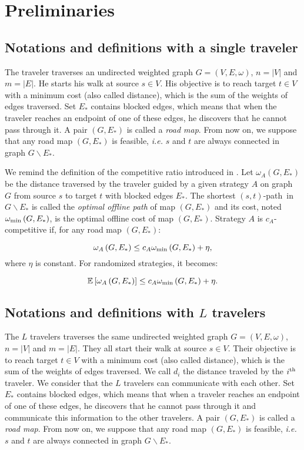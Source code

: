 \documentclass[letter-size, 11pt]{article}
\newcommand{\card}[1]{\left| #1 \right|}
\newcommand{\ith}[1]{#1^{\mbox{\scriptsize{th}}}}
\newcommand{\stpath}{$(s,t)$-path}
\newcommand{\omegamin}{\omega_{\mbox{\scriptsize{min}}}}
\begin{document}
\section{Preliminaries}

\subsection{Notations and definitions with a single traveler} 
The traveler traverses an undirected weighted graph $G=\left(V,E,\omega\right)$, $n = \card{V}$ and $m = \card{E}$. He starts his walk at source $s \in V$. His objective is to reach target $t\in V$ with a minimum cost (also called distance), which is the sum of the weights of edges traversed. Set $E_*$ contains blocked edges, which means that when the traveler reaches an endpoint of one of these edges, he discovers that he cannot pass through it. A pair $\left(G,E_*\right)$ is called a \textit{road map}. From now on, we suppose that any road map $\left(G,E_*\right)$ is feasible, {\em i.e.} $s$ and $t$ are always connected in graph $G\backslash E_*$.

We remind the definition of the competitive ratio introduced in \cite{BoEl98}. Let $\omega_A\left(G,E_*\right)$ be the distance traversed by the traveler guided by a given strategy $A$ on graph $G$ from source $s$ to target $t$ with blocked edges $E_*$. The shortest \stpath ~in $G\backslash E_*$ is called the \textit{optimal offline path} of map $\left(G,E_*\right)$ and its cost, noted $\omegamin\left(G,E_*\right)$, is the optimal offline cost of map $\left(G,E_*\right)$. Strategy $A$ is $c_A$-competitive if, for any road map $\left(G,E_*\right)$:

\[
\omega_A\left(G,E_*\right) \leq c_A\omegamin\left(G,E_*\right) + \eta,
\]
where $\eta$ is constant. For randomized strategies, it becomes:

\[
\mathbb{E}\left[\omega_A\left(G,E_*\right)\right] \leq c_A\omegamin\left(G,E_*\right) + \eta.
\]

\subsection{Notations and definitions with $L$ travelers}

The $L$ travelers traverses the same undirected weighted graph $G=\left(V,E,\omega\right)$, $n = \card{V}$ and $m = \card{E}$. They all start their walk at source $s \in V$. Their objective is to reach target $t\in V$ with a minimum cost (also called distance), which is the sum of the weights of edges traversed. We call $d_i$ the distance traveled by the $\ith{i}$ traveler. We consider that the $L$ travelers can communicate with each other. Set $E_*$ contains blocked edges, which means that when a traveler reaches an endpoint of one of these edges, he discovers that he cannot pass through it and communicate this information to the other travelers. A pair $\left(G,E_*\right)$ is called a \textit{road map}. From now on, we suppose that any road map $\left(G,E_*\right)$ is feasible, {\em i.e.} $s$ and $t$ are always connected in graph $G\backslash E_*$.
\end{document}
